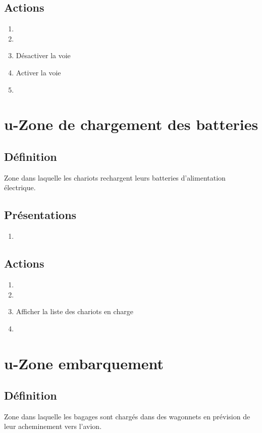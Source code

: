 \subsection{Actions}
\begin{enumerate}
	\item {}
	\item {}
	\item Désactiver la voie
	\item Activer la voie
	\item \etat
\end{enumerate}

\section{u-Zone de chargement des batteries}
\subsection{Définition}
	Zone dans laquelle les chariots rechargent leurs batteries d'alimentation électrique.

\subsection{Présentations}
\begin{enumerate}
	\item \rectetiquette
\end{enumerate}

\subsection{Actions}
\begin{enumerate}
	\item {}
	\item {}
	\item Afficher la liste des chariots en charge
	\item \transit
\end{enumerate}

\section{u-Zone embarquement}
\subsection{Définition}
	Zone dans laquelle les bagages sont chargés dans des wagonnets en prévision de leur acheminement vers l'avion.

